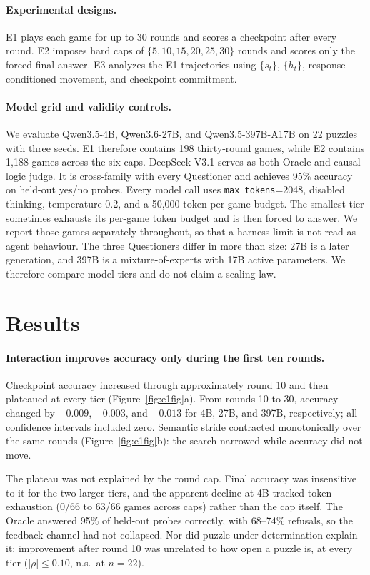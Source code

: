\documentclass{article}
\begin{document}
\paragraph{Experimental designs.}
E1 plays each game for up to 30 rounds and scores a checkpoint after every
round. E2 imposes hard caps of $\{5,10,15,20,25,30\}$ rounds and scores only
the forced final answer. E3 analyzes the
E1 trajectories using $\{s_t\}$, $\{h_t\}$, response-conditioned movement,
and checkpoint commitment.

\paragraph{Model grid and validity controls.}
We evaluate Qwen3.5-4B, Qwen3.6-27B, and Qwen3.5-397B-A17B on 22 puzzles with
three seeds. E1 therefore contains 198 thirty-round games, while E2 contains
1,188 games across the six caps. DeepSeek-V3.1 serves as both Oracle and
causal-logic judge. It is cross-family with every Questioner and achieves
95\% accuracy on held-out yes/no probes. Every model call uses
\texttt{max\_tokens}=2048, disabled thinking, temperature 0.2, and a
50,000-token per-game budget. 
The smallest tier sometimes exhausts its per-game token budget and is then forced to answer. We report those games separately throughout, so that a harness limit is not read as agent behaviour.
The three Questioners differ in more than size: 27B is a later generation, and 397B is a mixture-of-experts with 17B active parameters. We therefore compare model tiers and do not claim a scaling law.

\section{Results}\label{sec:results}

\paragraph{Interaction improves accuracy only during the first ten rounds.}
Checkpoint accuracy increased through approximately round 10 and then
plateaued at every tier (Figure~\ref{fig:e1fig}a). From rounds 10 to 30,
accuracy changed by $-0.009$, $+0.003$, and $-0.013$ for 4B, 27B, and 397B,
respectively; all confidence intervals included zero. Semantic stride
contracted monotonically over the same rounds (Figure~\ref{fig:e1fig}b): the
search narrowed while accuracy did not move.

The plateau was not explained by the round cap. Final accuracy was insensitive
to it for the two larger tiers, and the apparent decline at 4B tracked token
exhaustion (0/66 to 63/66 games across caps) rather than the cap itself. The Oracle answered 95\% of held-out probes correctly, with 68--74\%
refusals, so the feedback channel had not collapsed. Nor did puzzle
under-determination explain it: improvement after round 10 was unrelated to
how open a puzzle is, at every tier ($|\rho| \leq 0.10$, n.s.\ at $n=22$).
\end{document}
